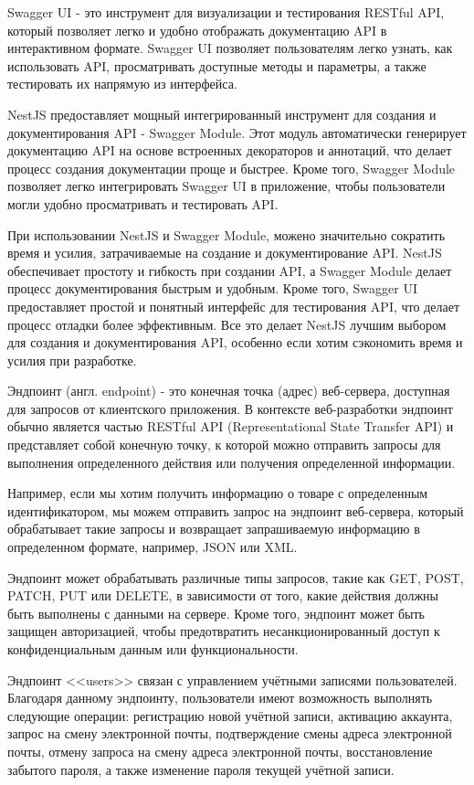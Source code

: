 Swagger UI - это инструмент для визуализации и тестирования RESTful API,
который позволяет легко и удобно отображать документацию API в интерактивном формате.
Swagger UI позволяет пользователям легко узнать, как использовать API, просматривать доступные методы и параметры, а также тестировать их напрямую из интерфейса.

NestJS предоставляет мощный интегрированный инструмент для создания и документирования API - Swagger Module.
Этот модуль автоматически генерирует документацию API на основе встроенных декораторов и аннотаций,
что делает процесс создания документации проще и быстрее.
Кроме того, Swagger Module позволяет легко интегрировать Swagger UI в приложение,
чтобы пользователи могли удобно просматривать и тестировать API.

При использовании NestJS и Swagger Module, можено значительно сократить время и усилия,
затрачиваемые на создание и документирование API.
NestJS обеспечивает простоту и гибкость при создании API, а Swagger Module делает процесс документирования быстрым и удобным.
Кроме того, Swagger UI предоставляет простой и понятный интерфейс для тестирования API,
что делает процесс отладки более эффективным. Все это делает NestJS лучшим выбором для создания и документирования API,
особенно если хотим сэкономить время и усилия при разработке.

Эндпоинт (англ. endpoint) - это конечная точка (адрес) веб-сервера, доступная для запросов от клиентского приложения.
В контексте веб-разработки эндпоинт обычно является частью RESTful API (Representational State Transfer API)
и представляет собой конечную точку, к которой можно отправить запросы для выполнения определенного действия или получения определенной информации.

Например, если мы хотим получить информацию о товаре с определенным идентификатором,
мы можем отправить запрос на эндпоинт веб-сервера, который обрабатывает такие запросы и возвращает запрашиваемую информацию в определенном формате,
например, JSON или XML.

Эндпоинт может обрабатывать различные типы запросов, такие как GET, POST, PATCH, PUT или DELETE,
в зависимости от того, какие действия должны быть выполнены с данными на сервере.
Кроме того, эндпоинт может быть защищен авторизацией, чтобы предотвратить несанкционированный доступ к конфиденциальным данным или функциональности.

Эндпоинт <<users>> связан с управлением учётными записями пользователей.
Благодаря данному эндпоинту, пользователи имеют возможность выполнять следующие операции:
регистрацию новой учётной записи,
активацию аккаунта,
запрос на смену электронной почты,
подтверждение смены адреса электронной почты,
отмену запроса на смену адреса электронной почты,
восстановление забытого пароля,
а также изменение пароля текущей учётной записи.

